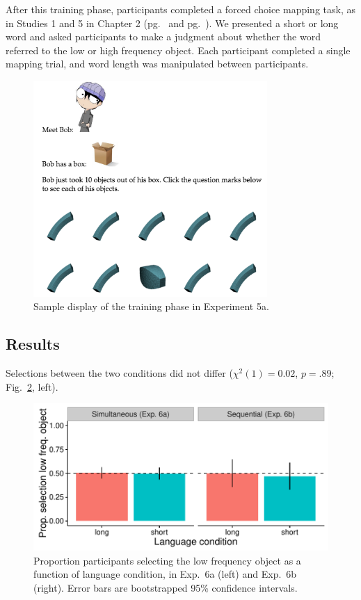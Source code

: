 After this training phase, participants completed a forced choice mapping task, as in Studies 1 and 5 in Chapter 2 (pg.\ \pageref{ch2-1} and pg.\ \pageref{ch2-5}). We presented a short or long word and asked participants to make a judgment about whether the word referred to the low or high frequency object. Each participant completed a single mapping trial, and word length was manipulated between participants.

 \begin{figure}[t!]
 \begin{center}
  \includegraphics[width=3.5in]{figs/seqfreq_display.png}
  \caption{\label{fig:seqfreq_display} Sample display of the training phase in Experiment 5a.}
 \end{center}
\end{figure}


 \subsection{Results}
 Selections between the two conditions did not differ (${\chi}^2$$(1) = 0.02$, $p = .89$; Fig.\ \ref{fig:freq_plots}, left).
 
  \begin{figure}[t!]
 \begin{center}
  \includegraphics[width=6in]{figs/freq_plots.pdf}
  \caption{\label{fig:freq_plots} Proportion participants selecting the low frequency object as a function of language condition, in Exp.\ 6a (left) and Exp.\ 6b (right). Error bars are bootstrapped 95\% confidence intervals.}
 \end{center}
\end{figure}

